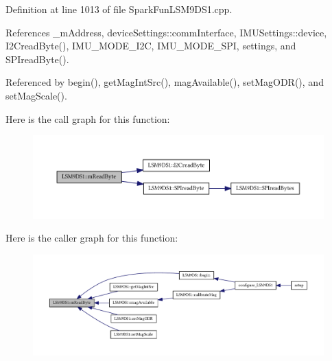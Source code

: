 Definition at line 1013 of file Spark\+Fun\+L\+S\+M9\+D\+S1.\+cpp.



References \+\_\+m\+Address, device\+Settings\+::comm\+Interface, I\+M\+U\+Settings\+::device, I2\+Cread\+Byte(), I\+M\+U\+\_\+\+M\+O\+D\+E\+\_\+\+I2C, I\+M\+U\+\_\+\+M\+O\+D\+E\+\_\+\+S\+PI, settings, and S\+P\+Iread\+Byte().



Referenced by begin(), get\+Mag\+Int\+Src(), mag\+Available(), set\+Mag\+O\+D\+R(), and set\+Mag\+Scale().



Here is the call graph for this function\+:\nopagebreak
\begin{figure}[H]
\begin{center}
\leavevmode
\includegraphics[width=350pt]{class_l_s_m9_d_s1_ae4e470321567e4f93fc09f4cc6cd9efa_cgraph}
\end{center}
\end{figure}




Here is the caller graph for this function\+:
\nopagebreak
\begin{figure}[H]
\begin{center}
\leavevmode
\includegraphics[width=350pt]{class_l_s_m9_d_s1_ae4e470321567e4f93fc09f4cc6cd9efa_icgraph}
\end{center}
\end{figure}



